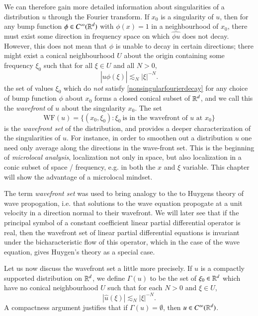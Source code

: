 We can therefore gain more detailed information about singularities of a distribution $u$ through the Fourier transform. If $x_0$ is a singularity of $u$, then for any bump function $\phi \in C^\infty(\operatorname{\mathbb{R}}^d)$ with $\phi(x) = 1$ in a neighbourhood of $x_0$, there must exist some direction in frequency space on which $\widehat{\phi u}$ does not decay. However, this does not mean that $\phi$ is unable to decay in certain directions; there might exist a conical neighbourhood $U$ about the origin containing some frequency $\xi_0$ such that for all $\xi \in U$ and all $N > 0$,
%
\begin{equation} \label{nonsingularfourierdecay}
  |\widehat{u \phi}(\xi)| \lesssim_N |\xi|^{-N}.
\end{equation}
%
the set of values $\xi_0$ which do \emph{not} satisfy \eqref{nonsingularfourierdecay} for any choice of bump function $\phi$ about $x_0$ forms a closed conical subset of $\operatorname{\mathbb{R}}^d$, and we call this the \emph{wavefront} of $u$ about the singularity $x_0$. The set
%
\[ \text{WF}(u) = \{ (x_0,\xi_0) : \xi_0\ \text{is in the wavefront of $u$ at $x_0$} \} \]
%
is the \emph{wavefront set} of the distribution, and provides a deeper characterization of the singularities of $u$. For instance, in order to smoothen out a distribution $u$ one need only average along the directions in the wave-front set. This is the beginning of \emph{microlocal analysis}, localization not only in space, but also localization in a conic subset of space / frequency, e.g. in both the $x$ and $\xi$ variable. This chapter will show the advantage of a microlocal mindset.

\begin{remark}
    The term \emph{wavefront set} was used to bring analogy to the to Huygens theory of wave propogation, i.e. that solutions to the wave equation propogate at a unit velocity in a direction normal to their wavefront. We will later see that if the principal symbol of a constant coefficient linear partial differential operator is real, then the wavefront set of linear partial differential equations is invariant under the bicharacteristic flow of this operator, which in the case of the wave equation, gives Huygen's theory as a special case.
\end{remark}

Let us now discuss the wavefront set a little more precisely. If $u$ is a compactly supported distribution on $\operatorname{\mathbb{R}}^d$, we define $\Gamma(u)$ to be the set of $\xi_0 \in \operatorname{\mathbb{R}}^d$ which have no conical neighbourhood $U$ such that for each $N > 0$ and $\xi \in U$,
%
\begin{equation} \label{fastDecayEquation}
    |\widehat{u}(\xi)| \lesssim_N |\xi|^{-N}.
\end{equation}
%
A compactness argument justifies that if $\Gamma(u) = \emptyset$, then $u \in C^\infty(\operatorname{\mathbb{R}}^d)$.

